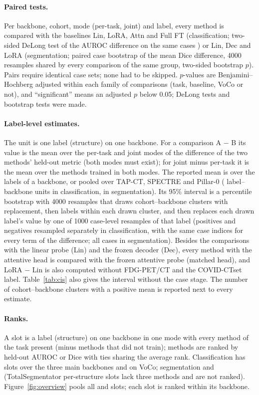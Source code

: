 \paragraph{Paired tests.} Per backbone, cohort, mode (per-task, joint) and label, every method is compared with the baselines Lin, LoRA, Attn and Full FT (classification; two-sided DeLong test of the AUROC difference on the same cases \citep{delong1988}) or Lin, Dec and LoRA (segmentation; paired case bootstrap of the mean Dice difference, 4000 resamples shared by every comparison of the same group, two-sided bootstrap $p$). Pairs require identical case sets; none had to be skipped. $p$-values are Benjamini--Hochberg adjusted \citep{benjamini1995fdr} within each family of comparisons (task, baseline, VoCo or not), and ``significant'' means an adjusted $p$ below 0.05; \numDelongTestsN{} DeLong tests and \numSegpairedTestsN{} bootstrap tests were made.

\paragraph{Label-level estimates.} The unit is one label (structure) on one backbone. For a comparison A $-$ B its value is the mean over the per-task and joint modes of the difference of the two methods' held-out metric (both modes must exist); for joint minus per-task it is the mean over the methods trained in both modes. The reported mean is over the labels of a backbone, or pooled over TAP-CT, SPECTRE and Pillar-0 (\numCiClsloralinAllLabelsN{} label--backbone units in classification, \numCiSegdeclinAllLabelsN{} in segmentation). Its 95\% interval is a percentile bootstrap with 4000 resamples that draws cohort--backbone clusters with replacement, then labels within each drawn cluster, and then replaces each drawn label's value by one of 1000 case-level resamples of that label (positives and negatives resampled separately in classification, with the same case indices for every term of the difference; all cases in segmentation). Besides the comparisons with the linear probe (Lin) and the frozen decoder (Dec), every method with the attentive head is compared with the frozen attentive probe (matched head), and LoRA $-$ Lin is also computed without FDG-PET/CT and the COVID-CTset label. Table~\ref{tab:cis} also gives the interval without the case stage. The number of cohort--backbone clusters with a positive mean is reported next to every estimate.

\paragraph{Ranks.} A slot is a label (structure) on one backbone in one mode with every method of the task present (minus methods that did not train); methods are ranked by held-out AUROC or Dice with ties sharing the average rank. Classification has \numRankSlotsN{} slots over the three main backbones and \numVocorankSlotsN{} on VoCo; segmentation \numSegrankSlotsN{} and \numVocosegrankSlotsN{} (TotalSegmentator per-structure slots lack three methods and are not ranked). Figure~\ref{fig:overview} pools all \numRankallSlotsN{} and \numSegrankallSlotsN{} slots; each slot is ranked within its backbone.

